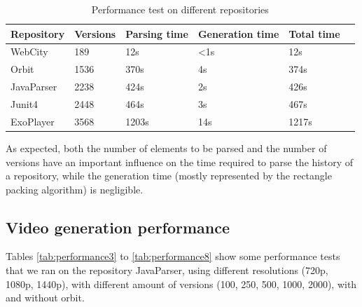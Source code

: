 \documentclass[]{usiinfbachelorproject}
\begin{document}
\begin{table}[H]
    \begin{center}
        \begin{tabular}{ | l | l | l | l | l | l |}
        \hline
        Repository & Versions & Parsing time & Generation time & Total time \\ \hline
        WebCity & 189 & 12s & <1s & 12s \\ \hline
        Orbit & 1536 & 370s & 4s & 374s \\ \hline
        JavaParser & 2238 & 424s & 2s & 426s \\ \hline
        Junit4 & 2448 & 464s & 3s & 467s \\ \hline
        ExoPlayer & 3568 & 1203s & 14s & 1217s \\ \hline
        \end{tabular}
    \end{center}
    \caption{Performance test on different repositories}
    \label{tab:performance}
\end{table}

As expected, both the number of elements to be parsed and the number of versions have an important influence on the time required to parse the history of a repository, while the generation time (mostly represented by the rectangle packing algorithm) is negligible.

\subsection{Video generation performance} \label{Video generation performance}
Tables \ref{tab:performance3} to \ref{tab:performance8} show some performance tests that we ran on the repository JavaParser, using different resolutions (720p, 1080p, 1440p), with different amount of versions (100, 250, 500, 1000, 2000), with and without orbit.
\end{document}
